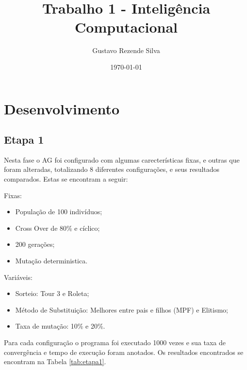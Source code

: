 \documentclass[a4paper, 12pt]{article}
\title {Trabalho 1 - Inteligência Computacional}
\date{\today}
\author{Gustavo Rezende Silva}
\begin{document}
  \maketitle
  \newpage

  \section{Desenvolvimento}

  \subsection{Etapa 1}
    Nesta fase o AG foi configurado com algumas carecterísticas fixas,
    e outras que foram alteradas, totalizando 8 diferentes configurações,
    e seus resultados comparados. Estas se encontram a seguir:

    Fixas:
    \begin{itemize}
    \item População de 100 indivíduos;
    \item Cross Over de 80\% e cíclico;
    \item 200 gerações;
    \item Mutação deterministica.
    \end{itemize}

    Variáveis:
    \begin{itemize}
    \item Sorteio: Tour 3 e Roleta;
    \item Método de Substituição: Melhores entre pais e filhos (MPF) e Elitismo;
    \item Taxa de mutação: 10\% e 20\%.
    \end{itemize}

    Para cada configuração o programa foi executado 1000 vezes e sua taxa de
     convergência e tempo de execução foram anotados. Os resultados encontrados
     se encontram na Tabela \ref{tab:etapa1}.
\end{document}
